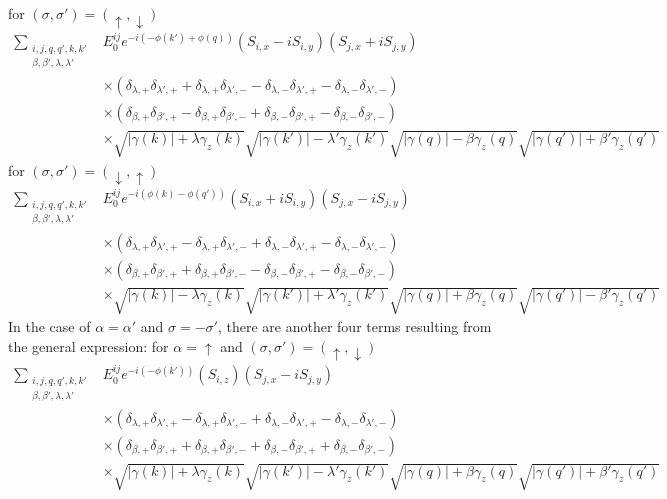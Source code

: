 for $(\sigma, \sigma') =(\uparrow, \downarrow)$
\begin{align}
    \sum_{\substack{i, j, q,q', k, k'\\ \beta, \beta', \lambda, \lambda'}} &E^{ij}_0 e^{-i(-\phi(k')+\phi(q))} \left(S_{i,x}-iS_{i,y}\right)\left( S_{j,x}+iS_{j,y}\right) \\ \nonumber
   &\times \left( \delta_{\lambda,+}\delta_{\lambda',+} + \delta_{\lambda,+}\delta_{\lambda',-}- \delta_{\lambda,-}\delta_{\lambda',+}-\delta_{\lambda,-}\delta_{\lambda',-}\right)\\\nonumber
   &\times \left( \delta_{\beta,+}\delta_{\beta',+} - \delta_{\beta,+}\delta_{\beta',-}+ \delta_{\beta,-}\delta_{\beta',+}-\delta_{\beta,-}\delta_{\beta',-}\right)\\\nonumber
   &\times \sqrt{|\gamma(k)|+ \lambda\gamma_z(k)}\sqrt{|\gamma(k')|-\lambda'\gamma_z(k')}\sqrt{|\gamma(q)|-\beta\gamma_z(q)}\sqrt{|\gamma(q')|+ \beta'\gamma_z(q')}
\end{align}
for $(\sigma, \sigma') =(\downarrow, \uparrow)$
\begin{align}
    \sum_{\substack{i, j, q,q', k, k'\\ \beta, \beta', \lambda, \lambda'}} &E^{ij}_0 e^{-i(\phi(k)-\phi(q'))} \left(S_{i,x}+iS_{i,y}\right)\left( S_{j,x}-iS_{j,y}\right) \\ \nonumber
   &\times \left( \delta_{\lambda,+}\delta_{\lambda',+} - \delta_{\lambda,+}\delta_{\lambda',-}+ \delta_{\lambda,-}\delta_{\lambda',+}-\delta_{\lambda,-}\delta_{\lambda',-}\right)\\\nonumber
   &\times \left( \delta_{\beta,+}\delta_{\beta',+} + \delta_{\beta,+}\delta_{\beta',-}- \delta_{\beta,-}\delta_{\beta',+}-\delta_{\beta,-}\delta_{\beta',-}\right)\\\nonumber
   &\times \sqrt{|\gamma(k)|-\lambda\gamma_z(k)}\sqrt{|\gamma(k')|+ \lambda'\gamma_z(k')}\sqrt{|\gamma(q)|+ \beta\gamma_z(q)}\sqrt{|\gamma(q')|-\beta'\gamma_z(q')}
\end{align}
In the case of $\alpha = \alpha'$ and $\sigma = -\sigma'$, there are another four terms resulting from the general expression: \newline
for $\alpha = \uparrow$ and $(\sigma, \sigma') =(\uparrow, \downarrow)$
\begin{align}
    \sum_{\substack{i, j, q,q', k, k'\\ \beta, \beta', \lambda, \lambda'}} & E^{ij}_0 e^{-i(-\phi(k'))}  \left(S_{i,z}\right) \left( S_{j,x}-iS_{j,y}\right)\\ \nonumber
   &\times \left( \delta_{\lambda,+}\delta_{\lambda',+} - \delta_{\lambda,+}\delta_{\lambda',-}+ \delta_{\lambda,-}\delta_{\lambda',+}-\delta_{\lambda,-}\delta_{\lambda',-}\right)\\\nonumber
   &\times \left( \delta_{\beta,+}\delta_{\beta',+} + \delta_{\beta,+}\delta_{\beta',-}+ \delta_{\beta,-}\delta_{\beta',+}+\delta_{\beta,-}\delta_{\beta',-}\right)\\\nonumber
   &\times \sqrt{|\gamma(k)|+ \lambda\gamma_z(k)}\sqrt{|\gamma(k')|- \lambda'\gamma_z(k')}\sqrt{|\gamma(q)|+ \beta\gamma_z(q)}\sqrt{|\gamma(q')|+ \beta'\gamma_z(q')}
\end{align}
